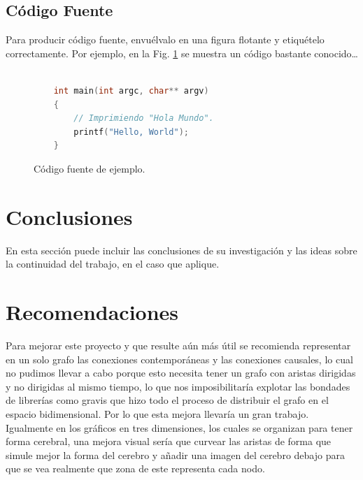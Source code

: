 \documentclass[a4paper,10pt,twocolumn]{article}
\begin{document}
	\subsection{Código Fuente}\label{sub:listings}
		Para producir código fuente, envuélvalo en una figura flotante y
		etiquételo correctamente. Por ejemplo, en la Fig. \ref{fig:code}
		se muestra un código bastante conocido\ldots


		\begin{figure}[htb]%
			\begin{lstlisting}[language=c]%

    int main(int argc, char** argv)
    {
        // Imprimiendo "Hola Mundo".
        printf("Hello, World");
    }

			\end{lstlisting}
		\caption{Código fuente de ejemplo.\label{fig:code}}
		\end{figure}



\section{Conclusiones}\label{sec:conc}

  En esta sección puede incluir las conclusiones de su investigación y las ideas
  sobre la continuidad del trabajo, en el caso que aplique.




\section{Recomendaciones}\label{sec:rec}

Para mejorar este proyecto y que resulte aún más útil se recomienda representar en un solo grafo las conexiones contemporáneas y las conexiones causales, lo cual no pudimos llevar a cabo porque esto necesita tener un grafo con aristas dirigidas y no dirigidas al mismo tiempo, lo que nos imposibilitaría explotar las bondades de librerías como gravis \cite{gv} que hizo todo el proceso de distribuir el grafo en el espacio bidimensional. Por lo que esta mejora llevaría un gran trabajo. \\
Igualmente en los gráficos en tres dimensiones, los cuales se organizan para tener forma cerebral, una mejora visual sería que curvear las aristas de forma que simule mejor la forma del cerebro y añadir una imagen del cerebro debajo para que se vea realmente que zona de este representa cada nodo.
\end{document}

